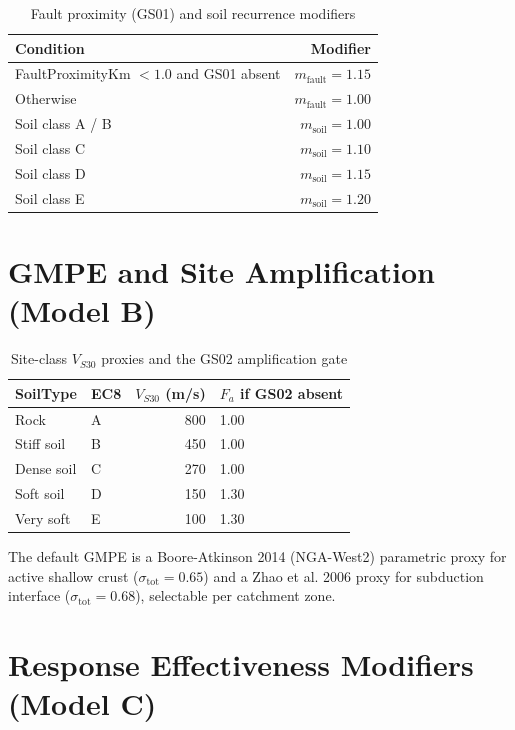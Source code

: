 \documentclass[11pt,a4paper]{article}
\begin{document}
\begin{table}[H]
  \centering
  \caption{Fault proximity (GS01) and soil recurrence modifiers}
  \begin{tabular}{lr}
    \toprule
    \textbf{Condition} & \textbf{Modifier} \\
    \midrule
    FaultProximityKm $< 1.0$ and GS01 absent & $m_{\text{fault}} = 1.15$ \\
    Otherwise & $m_{\text{fault}} = 1.00$ \\
    Soil class A / B & $m_{\text{soil}} = 1.00$ \\
    Soil class C & $m_{\text{soil}} = 1.10$ \\
    Soil class D & $m_{\text{soil}} = 1.15$ \\
    Soil class E & $m_{\text{soil}} = 1.20$ \\
    \bottomrule
  \end{tabular}
\end{table}

\section{GMPE and Site Amplification (Model B)}\label{app:gmpe}

\begin{table}[H]
  \centering
  \caption{Site-class $V_{S30}$ proxies and the GS02 amplification gate}
  \begin{tabular}{llrl}
    \toprule
    \textbf{SoilType} & \textbf{EC8} & \textbf{$V_{S30}$ (m/s)} &
    \textbf{$F_a$ if GS02 absent} \\
    \midrule
    Rock          & A & 800 & 1.00 \\
    Stiff soil    & B & 450 & 1.00 \\
    Dense soil    & C & 270 & 1.00 \\
    Soft soil     & D & 150 & 1.30 \\
    Very soft     & E & 100 & 1.30 \\
    \bottomrule
  \end{tabular}
\end{table}

The default GMPE is a Boore-Atkinson 2014 (NGA-West2) parametric proxy for active
shallow crust ($\sigma_{\text{tot}} = 0.65$) and a Zhao et al. 2006 proxy for
subduction interface ($\sigma_{\text{tot}} = 0.68$), selectable per catchment
zone.

\section{Response Effectiveness Modifiers (Model C)}\label{app:resp}
\end{document}
